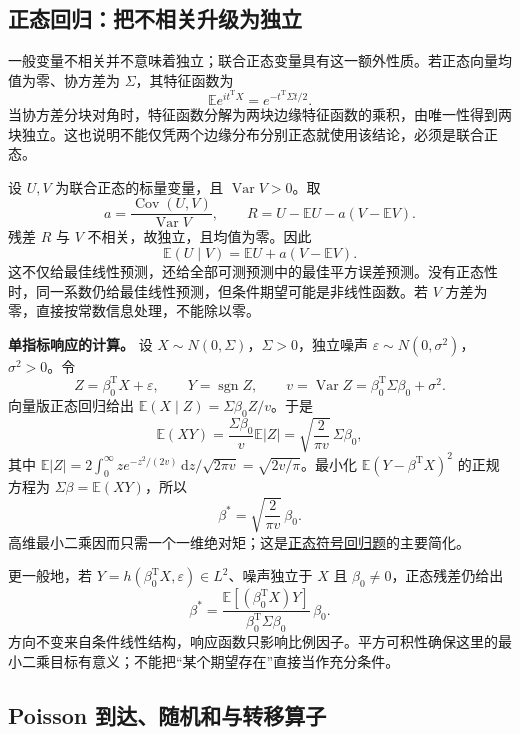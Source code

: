 \subsection{正态回归：把不相关升级为独立}

\label{app:probability-gaussian}

一般变量不相关并不意味着独立；联合正态变量具有这一额外性质。若正态向量均值为零、协方差为 $\Sigma$，其特征函数为
\[
\mathbb Ee^{it^{\mathrm T}X}=e^{-t^{\mathrm T}\Sigma t/2}.
\]
当协方差分块对角时，特征函数分解为两块边缘特征函数的乘积，由唯一性得到两块独立。这也说明不能仅凭两个边缘分布分别正态就使用该结论，必须是联合正态。

设 $U,V$ 为联合正态的标量变量，且 $\operatorname{Var}V>0$。取
\[
a=\frac{\operatorname{Cov}(U,V)}{\operatorname{Var}V},\qquad
R=U-\mathbb EU-a(V-\mathbb EV).
\]
残差 $R$ 与 $V$ 不相关，故独立，且均值为零。因此
\[
\mathbb E(U\mid V)=\mathbb EU+a(V-\mathbb EV).
\]
这不仅给最佳线性预测，还给全部可测预测中的最佳平方误差预测。没有正态性时，同一系数仍给最佳线性预测，但条件期望可能是非线性函数。若 $V$ 方差为零，直接按常数信息处理，不能除以零。

\textbf{单指标响应的计算。} 设 $X\sim N(0,\Sigma)$，$\Sigma>0$，独立噪声 $\varepsilon\sim N(0,\sigma^2)$，$\sigma^2>0$。令
\[
Z=\beta_0^{\mathrm T}X+\varepsilon,\qquad Y=\operatorname{sgn}Z,
\qquad v=\operatorname{Var}Z=\beta_0^{\mathrm T}\Sigma\beta_0+\sigma^2.
\]
向量版正态回归给出 $\mathbb E(X\mid Z)=\Sigma\beta_0 Z/v$。于是
\[
\mathbb E(XY)=\frac{\Sigma\beta_0}{v}\mathbb E|Z|
=\sqrt{\frac2{\pi v}}\,\Sigma\beta_0,
\]
其中 $\mathbb E|Z|=2\int_0^\infty z e^{-z^2/(2v)}\,\mathrm dz/\sqrt{2\pi v}=\sqrt{2v/\pi}$。最小化 $\mathbb E(Y-\beta^{\mathrm T}X)^2$ 的正规方程为 $\Sigma\beta=\mathbb E(XY)$，所以
\[
\beta^*=\sqrt{\frac2{\pi v}}\,\beta_0.
\]
高维最小二乘因而只需一个一维绝对矩；这是\hyperref[pr:fin13-high:12]{正态符号回归题}的主要简化。

更一般地，若 $Y=h(\beta_0^{\mathrm T}X,\varepsilon)\in L^2$、噪声独立于 $X$ 且 $\beta_0\ne0$，正态残差仍给出
\[
\beta^*=\frac{\mathbb E[(\beta_0^{\mathrm T}X)Y]}{\beta_0^{\mathrm T}\Sigma\beta_0}\,\beta_0.
\]
方向不变来自条件线性结构，响应函数只影响比例因子。平方可积性确保这里的最小二乘目标有意义；不能把“某个期望存在”直接当作充分条件。

\subsection{Poisson 到达、随机和与转移算子}

\label{app:probability-poisson}

